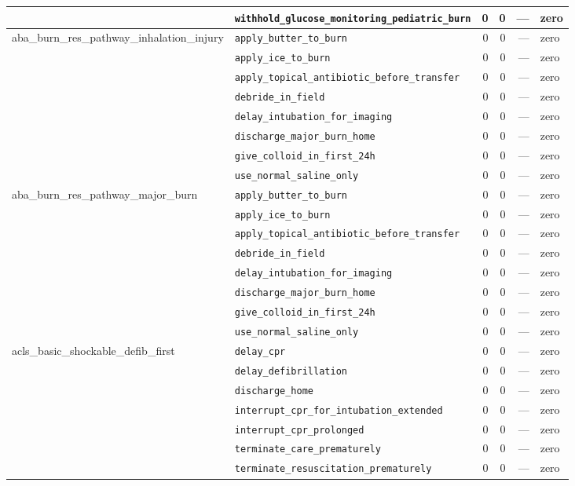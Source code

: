 \begin{table}[ht]
\begin{tabular}{llrrrl}
 & \texttt{withhold\_glucose\_monitoring\_pediatric\_burn} & 0 & 0 & — & zero \\
\midrule
aba\_burn\_res\_pathway\_inhalation\_injury & \texttt{apply\_butter\_to\_burn} & 0 & 0 & — & zero \\
 & \texttt{apply\_ice\_to\_burn} & 0 & 0 & — & zero \\
 & \texttt{apply\_topical\_antibiotic\_before\_transfer} & 0 & 0 & — & zero \\
 & \texttt{debride\_in\_field} & 0 & 0 & — & zero \\
 & \texttt{delay\_intubation\_for\_imaging} & 0 & 0 & — & zero \\
 & \texttt{discharge\_major\_burn\_home} & 0 & 0 & — & zero \\
 & \texttt{give\_colloid\_in\_first\_24h} & 0 & 0 & — & zero \\
 & \texttt{use\_normal\_saline\_only} & 0 & 0 & — & zero \\
\midrule
aba\_burn\_res\_pathway\_major\_burn & \texttt{apply\_butter\_to\_burn} & 0 & 0 & — & zero \\
 & \texttt{apply\_ice\_to\_burn} & 0 & 0 & — & zero \\
 & \texttt{apply\_topical\_antibiotic\_before\_transfer} & 0 & 0 & — & zero \\
 & \texttt{debride\_in\_field} & 0 & 0 & — & zero \\
 & \texttt{delay\_intubation\_for\_imaging} & 0 & 0 & — & zero \\
 & \texttt{discharge\_major\_burn\_home} & 0 & 0 & — & zero \\
 & \texttt{give\_colloid\_in\_first\_24h} & 0 & 0 & — & zero \\
 & \texttt{use\_normal\_saline\_only} & 0 & 0 & — & zero \\
\midrule
acls\_basic\_shockable\_defib\_first & \texttt{delay\_cpr} & 0 & 0 & — & zero \\
 & \texttt{delay\_defibrillation} & 0 & 0 & — & zero \\
 & \texttt{discharge\_home} & 0 & 0 & — & zero \\
 & \texttt{interrupt\_cpr\_for\_intubation\_extended} & 0 & 0 & — & zero \\
 & \texttt{interrupt\_cpr\_prolonged} & 0 & 0 & — & zero \\
 & \texttt{terminate\_care\_prematurely} & 0 & 0 & — & zero \\
 & \texttt{terminate\_resuscitation\_prematurely} & 0 & 0 & — & zero \\

\end{tabular}
\end{table}
